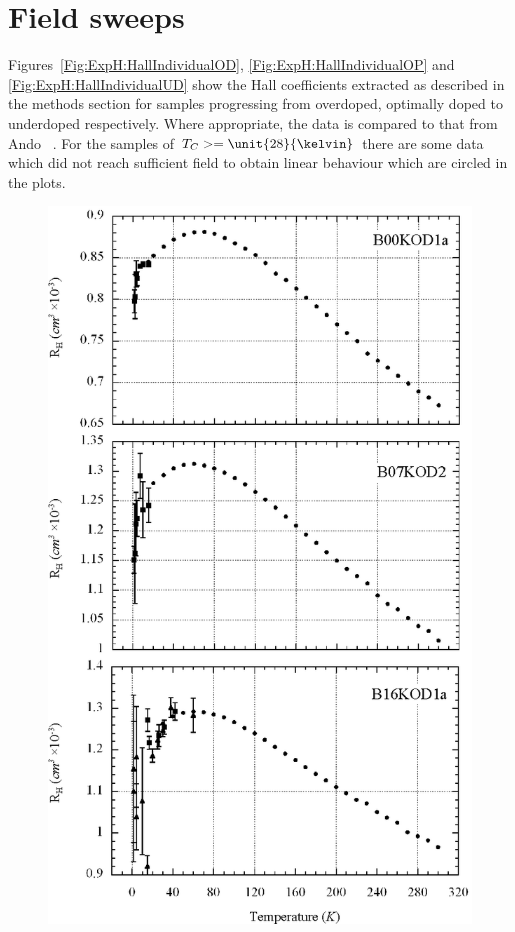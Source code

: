 \section{Field sweeps}

Figures~\ref{Fig:ExpH:HallIndividualOD}, \ref{Fig:ExpH:HallIndividualOP} and \ref{Fig:ExpH:HallIndividualUD} show the Hall coefficients extracted as described in the methods section for samples progressing from overdoped, optimally doped to underdoped respectively. Where appropriate, the data is compared to that from Ando \etal~\cite{Ando1999}. For the samples of $T_C >= \unit{28}{\kelvin}$ there are some data which did not reach sufficient field to obtain linear behaviour which are circled in the plots.

\begin{figure}[htbp]
	\begin{center}
		\includegraphics[scale=0.9]{Chapter-HallBSCO/Figures/HallIndividual/HallIndividualOD}

\end{center}
\end{figure}
